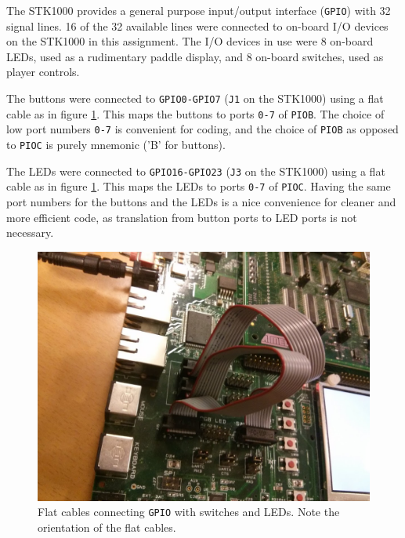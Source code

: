 The STK1000 provides a general purpose input/output interface (\texttt{GPIO}) with 32 signal lines.
16 of the 32 available lines were connected to on-board I/O devices on the STK1000 in this assignment.
The I/O devices in use were 8 on-board LEDs, used as a rudimentary paddle display, and 8 on-board switches, used as player controls.

The buttons were connected to \texttt{GPIO0-GPIO7} (\texttt{J1} on the STK1000) using a flat cable as in figure \ref{flat-cable-image}. This maps the buttons to ports \texttt{0-7} of \texttt{PIOB}.
The choice of low port numbers \texttt{0-7} is convenient for coding, and the choice of \texttt{PIOB} as opposed to \texttt{PIOC} is purely mnemonic ('B' for buttons).

The LEDs were connected to \texttt{GPIO16-GPIO23} (\texttt{J3} on the STK1000) using a flat cable as in figure \ref{flat-cable-image}. This maps the LEDs to ports \texttt{0-7} of \texttt{PIOC}.
Having the same port numbers for the buttons and the LEDs is a nice convenience for cleaner and more efficient code, as translation from button ports to LED ports is not necessary.

\begin{figure}
\includegraphics[width = \textwidth]{description-and-methodology/flat-cable-image.jpg}
\caption{Flat cables connecting \texttt{GPIO} with switches and LEDs. Note the orientation of the flat cables.}
\label{flat-cable-image}
\end{figure}
